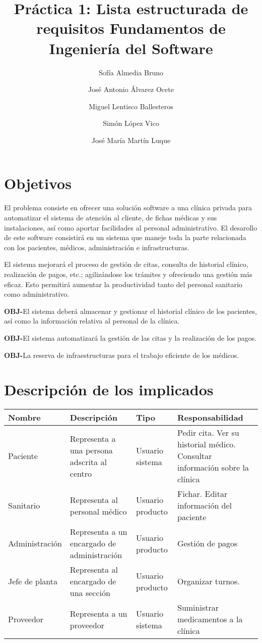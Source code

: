 \documentclass[11pt,a4paper]{article}
\title{Práctica 1: Lista estructurada de requisitos \large Fundamentos de Ingeniería del Software}
\author{Sofía Almedia Bruno \and José Antonio Álvarez Ocete \and Miguel Lentisco Ballesteros \and Simón López Vico \and José María Martín Luque}
\newcounter{ObjCounter}
\newcommand{\obj}[1]{\addtocounter{ObjCounter}{1}\textbf{\rmfamily OBJ-\theObjCounter}\quad#1\\}
\begin{document}
\maketitle

\section{Objetivos} %
\label{sec:estudio_del_dominio_del_problema}

El problema consiste en ofrecer una solución software a una clínica privada para automatizar el sistema de atención al cliente, de fichas médicas y sus instalaciones, así como aportar facilidades al personal administrativo. El desarollo de este software consistirá en un sistema que maneje toda la parte relacionada con los pacientes, médicos, administración e infrastructuras.

El sistema mejorará el proceso de gestión de citas, consulta de historial clínico, realización de pagos, etc.; agilizándose los trámites y ofreciendo una gestión más eficaz. Esto permitirá aumentar la productividad tanto del personal sanitario como administrativo.

\obj{El sistema deberá almacenar y gestionar el historial clínico de  los pacientes, así como la información relativa al personal de la clínica.}
\obj{El sistema automatizará la gestión de las citas y la realización de los pagos.}
\obj{La reserva de infraestructuras para el trabajo eficiente de los médicos.}

\section{Descripción de los implicados} %
\label{sec:descripción_de_los_implicados}
\begin{adjustbox}{center}
	\begin{tabular}{l>{\raggedright}p{4cm}l>{\raggedright}p{4cm}}
		\bfseries Nombre &\bfseries Descripción &\bfseries Tipo &\bfseries Responsabilidad \tabularnewline\hline
		Paciente & Representa a una persona adscrita al centro & Usuario sistema & Pedir cita. Ver su historial médico. Consultar información sobre la clínica \tabularnewline
		Sanitario & Representa al personal médico & Usuario producto & Fichar. Editar información del paciente\tabularnewline
		Administración & Representa a un encargado de administración & Usuario producto & Gestión de pagos\tabularnewline
		Jefe de planta & Representa al encargado de una sección & Usuario producto & Organizar turnos.\tabularnewline
		Proveedor & Representa a un proveedor & Usuario sistema & Suministrar medicamentos a la clínica
	\end{tabular}
\end{adjustbox}
\end{document}
